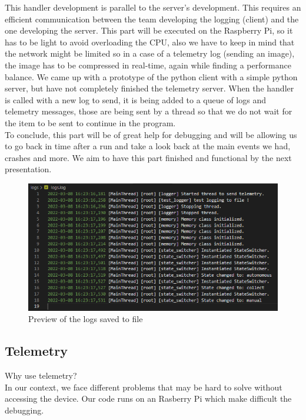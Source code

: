 \documentclass[12pt]{article}
\begin{document}
This handler development is parallel to the server's development. This requires an efficient communication between the team developing the logging (client) and the one developing the server. This part will be executed on the Raspberry Pi, so it has to be light to avoid overloading the CPU, also we have to keep in mind that the network might be limited so in a case of a telemetry log (sending an image), the image has to be compressed in real-time, again while finding a performance balance.
We came up with a prototype of the python client with a simple python server, but have not completely finished the telemetry server. When the handler is called with a new log to send, it is being added to a queue of logs and telemetry messages, those are being sent by a thread so that we do not wait for the item to be sent to continue in the program. \\
To conclude, this part will be of great help for debugging and will be allowing us to go back in time after a run and take a look back at the main events we had, crashes and more. We aim to have this part finished and functional by the next presentation.

\begin{figure}[h!]
    \includegraphics[width=\textwidth]{../../docs/logs.png}
    \caption{Preview of the logs saved to file}
    \label{fig:logs}
\end{figure}

\newpage 

\subsection{Telemetry}
Why use telemetry? \\

In our context, we face different problems that may be hard to solve without accessing the device. Our code runs on an Rasberry Pi which make difficult the debugging. \\
\end{document}
